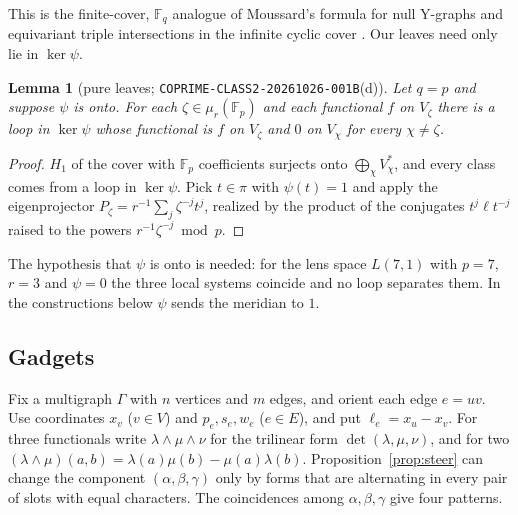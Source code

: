 \documentclass[11pt]{article}
\newtheorem{lemma}[theorem]{Lemma}
\theoremstyle{definition}
\theoremstyle{remark}
\newcommand{\F}{\mathbb{F}}
\begin{document}
This is the finite-cover, $\F_q$ analogue of Moussard's formula for null
Y-graphs and equivariant triple intersections in the infinite cyclic cover
\cite[Prop.~2.5, Thm.~2.7]{Mou17}. Our leaves need only lie in $\ker\psi$.

\begin{lemma}[pure leaves; \texttt{COPRIME-CLASS2-20261026-001B}(d)]\label{lem:pure}
Let $q=p$ and suppose $\psi$ is onto. For each $\zeta\in\mu_r(\F_p)$ and each
functional $f$ on $V_\zeta$ there is a loop in $\ker\psi$ whose functional is
$f$ on $V_\zeta$ and $0$ on $V_\chi$ for every $\chi\ne\zeta$.
\end{lemma}

\begin{proof}
$H_1$ of the cover with $\F_p$ coefficients surjects onto
$\bigoplus_\chi V_\chi^*$, and every class comes from a loop in $\ker\psi$.
Pick $t\in\pi$ with $\psi(t)=1$ and apply the eigenprojector
$P_\zeta=r^{-1}\sum_j\zeta^{-j}t^j$, realized by the product of the conjugates
$t^j\ell t^{-j}$ raised to the powers $r^{-1}\zeta^{-j}\bmod p$.
\end{proof}

The hypothesis that $\psi$ is onto is needed: for the lens space $L(7,1)$ with
$p=7$, $r=3$ and $\psi=0$ the three local systems coincide and no loop
separates them. In the constructions below $\psi$ sends the meridian to $1$.

\subsection{Gadgets}

Fix a multigraph $\Gamma$ with $n$ vertices and $m$ edges, and orient each
edge $e=uv$. Use coordinates $x_v$ ($v\in V$) and $p_e,s_e,w_e$ ($e\in E$),
and put $\ell_e=x_u-x_v$. For three functionals write $\lambda\wedge\mu\wedge\nu$
for the trilinear form $\det(\lambda,\mu,\nu)$, and for two
$(\lambda\wedge\mu)(a,b)=\lambda(a)\mu(b)-\mu(a)\lambda(b)$. Proposition~\ref{prop:steer}
can change the component $(\alpha,\beta,\gamma)$ only by forms that are
alternating in every pair of slots with equal characters. The coincidences
among $\alpha,\beta,\gamma$ give four patterns.
\end{document}
